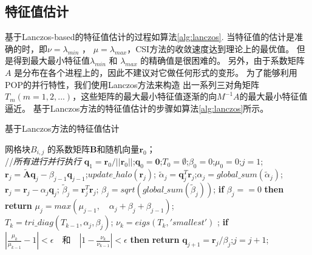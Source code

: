 \subsection{特征值估计}
\label{solver:eigs}
基于Lanczos-based的特征值估计的过程如算法\ref{alg:lanczos}.
当特征值的估计是准确的时，即$\nu = \lambda_{min}$ ， $\mu =\lambda_{max}$，CSI方法的收敛速度达到理论上的最优值。 
但是得到最大最小特征值$\lambda_{min}$ 和 $\lambda_{max}$ 的精确值是很困难的。
另外，由于系数矩阵$A$ 是分布在各个进程上的，因此不建议对它做任何形式的变形。  
为了能够利用POP的并行特性，我们使用Lanczos方法来构造 出一系列三对角矩阵$T_m (m=1,2,...)$，这些矩阵的最大最小特征值逐渐的向$M^{-1}A$的最大最小特征值逼近。
基于Lanczos方法的特征值估计的步骤如算法\ref{alg:lanczos}所示。 
\begin{algorithm}
\caption{ 基于Lanczos方法的特征值估计}
\label{alg:lanczos}
\begin{algorithmic}[1]
\REQUIRE  网格块$B_{i,j}$ 的系数矩阵$\textbf{B}$和随机向量$\textbf{r}_0$；\\
 //\qquad    \textit{所有进行并行执行}
\STATE $\textbf{q}_1 = \textbf{r}_0/||\textbf{r}_0||$;\quad $\textbf{q}_0=\textbf{0}$;\quad $T_0=\emptyset$;\quad $\beta_0 =0$;\quad  $\mu_0 =0$;\quad $j=1$;
\STATE $\textbf{r}_j=\tilde{\textbf{A}}\textbf{q}_j-\beta_{j-1}\textbf{q}_{j-1}$;\quad $update\_halo(\textbf{r}_j)$;
\STATE $\tilde{\alpha}_j =\textbf{q}_j^T\textbf{r}_j$;\quad $\alpha_j=global\_sum(\tilde{\alpha}_j)$; 
\STATE $\textbf{r}_j=\textbf{r}_j-\alpha_{j}\textbf{q}_{j}$;
\STATE $\tilde{\beta}_j = \textbf{r}_j^T\textbf{r}_j$; \quad $\beta_j=sqrt(global\_sum(\tilde{\beta}_j))$;
\STATE \textbf{if} $\beta_j == 0$ \textbf{then} \textbf{return}
\STATE $\mu_j = max(\mu_{j-1}, \quad \alpha_j+\beta_j+\beta_{j-1})$; \label{lanczos_gersh} \\
\STATE $T_k=tri\_diag(T_{k-1},\alpha_j,\beta_j)$; \quad $\nu_k = eigs(T_k,'smallest')$ ; \label{lanczos_tridiag} 
\STATE \textbf{if} $|\frac{\mu_k}{\mu_{k-1}} -1 |< \epsilon\quad\textbf{和}\quad|1- \frac{\nu_k}{\nu_{k-1}}|< \epsilon$ \textbf{then} \textbf{return}
\STATE $\textbf{q}_{j+1}= \textbf{r}_j/\beta_j$;\quad $j=j+1$;
\ENDWHILE
\end{algorithmic}
\end{algorithm}
 
